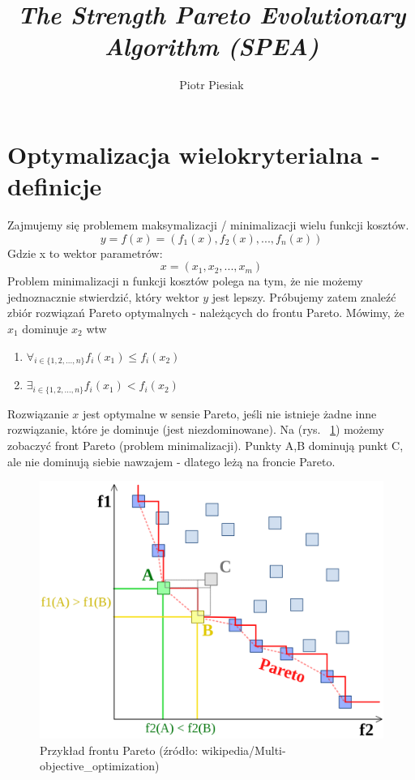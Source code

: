 \documentclass[a4paper]{article}
\title{\emph{The Strength Pareto Evolutionary
Algorithm (SPEA)}}
\author{Piotr Piesiak}
\begin{document}
\maketitle
\section{Optymalizacja wielokryterialna - definicje}
Zajmujemy się problemem maksymalizacji / minimalizacji wielu funkcji kosztów. $$ y = f(x) = (f_1(x), f_2(x), ... ,f_n(x)) $$
Gdzie x to wektor parametrów: $$ x = (x_1, x_2, ... , x_m) $$
Problem minimalizacji n funkcji kosztów polega na tym, że nie możemy jednoznacznie stwierdzić, który wektor $y$ jest lepszy. Próbujemy zatem znaleźć zbiór rozwiązań Pareto optymalnych - należących do frontu Pareto. Mówimy, że $x_1$ dominuje $x_2$ wtw
\begin{enumerate}
\item $\forall_{i \in \{1,2,...,n\}} f_i(x_1) \leq f_i(x_2)$
\item $\exists_{i \in \{1,2,...,n\}} f_i(x_1) < f_i(x_2)$
\end{enumerate}
Rozwiązanie $x$ jest optymalne w sensie Pareto, jeśli nie istnieje żadne inne rozwiązanie, które je dominuje (jest niezdominowane). Na (rys. ~\ref{fig:f_pareto}) możemy zobaczyć front Pareto (problem minimalizacji). Punkty A,B dominują punkt C, ale nie dominują siebie nawzajem - dlatego leżą na froncie Pareto.
\begin{figure}[htbp]{}
\centerline{\includegraphics[scale=.13]{Front_pareto.svg.png}}
\caption{Przykład frontu Pareto (źródło: wikipedia/Multi-objective\_optimization)}
\label{fig:f_pareto}
\end{figure}
\end{document}
